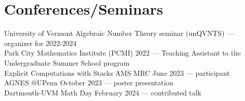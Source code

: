 \documentclass[letterpaper]{article}
\begin{document}
	\section*{Conferences/Seminars}
	\noindent University of Vermont Algebraic Number Theory seminar (unQVNTS) --- organizer for $2022$-$2024$\\
	\noindent Park City Mathematics Institute (PCMI) $2022$ --- Teaching Assistant to the Undergraduate Summer School program\\
	\noindent Explicit Computations with Stacks AMS MRC June $2023$ --- participant\\
	\noindent AGNES @UPenn October $2023$ --- poster presentation\\
	\noindent Dartmouth-UVM Math Day February $2024$ --- contributed talk
	
	
	
	
\end{document}

